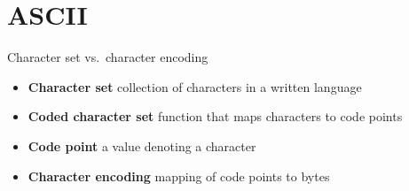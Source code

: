 \documentclass[../index.tex]{subfiles}
\begin{document}
\renewcommand{\sectiontitle}{ASCII}
\section{\sectiontitle}
%

\renewcommand{\currenttitle}{Character set vs.\ character encoding}
\begin{frame}{\currenttitle}
%
%
%
%
  \begin{itemize}[leftmargin=*]
    \item[] \textbf{Character set} \textendash{} collection of characters in a written language
    \item[] \textbf{Coded character set} \textendash{} function that maps characters to code points
    \item[] \textbf{Code point} \textendash{} a value denoting a character
    \item[] \textbf{Character encoding}
            \textendash{} mapping of code points to bytes\footnotemark{}
  \end{itemize}
\end{frame}
\end{document}
